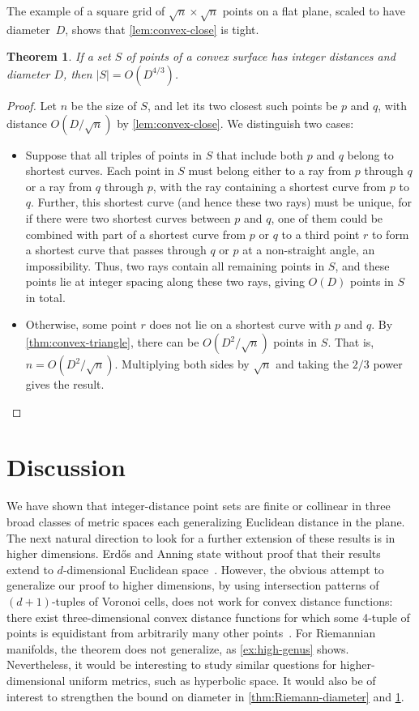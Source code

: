 \documentclass[11pt]{article}
\newtheorem{theorem}{Theorem}
\theoremstyle{definition}
\begin{document}
The example of a square grid of $\sqrt{n}\times\sqrt{n}$ points on a flat plane, scaled to have diameter~$D$, shows that \cref{lem:convex-close} is tight.

\begin{theorem}
\label{thm:convex-diameter}
If a set $S$ of points of a convex surface has integer distances and diameter $D$, then $|S|=O(D^{4/3})$.
\end{theorem}

\begin{proof}
Let $n$ be the size of $S$, and let its two closest such points be $p$ and $q$, with distance $O(D/\sqrt{n})$ by \cref{lem:convex-close}.  We distinguish two cases:
\begin{itemize}
\item Suppose that all triples of points in $S$ that include both $p$ and $q$ belong to shortest curves. Each point in $S$ must belong either to a ray from $p$ through $q$ or a ray from $q$ through $p$, with the ray containing a shortest curve from $p$ to $q$.
Further, this shortest curve (and hence these two rays) must be unique, for if there were two shortest curves between $p$ and $q$, one of them could be combined with part of a shortest curve from $p$ or $q$ to a third point $r$ to form a shortest curve that passes through $q$ or $p$ at a non-straight angle, an impossibility. Thus, two rays contain all remaining points in $S$, and these points lie at integer spacing along these two rays, giving $O(D)$ points in $S$ in total.
\item Otherwise, some point $r$ does not lie on a shortest curve with $p$ and $q$. By \cref{thm:convex-triangle}, there can be $O(D^2/\sqrt{n})$ points in $S$. That is, $n=O(D^2/\sqrt{n})$. Multiplying both sides by $\sqrt{n}$ and taking the $2/3$ power gives the result.\qedhere
\end{itemize}
\end{proof}

\section{Discussion}

We have shown that integer-distance point sets are finite or collinear in three broad classes of metric spaces each generalizing Euclidean distance in the plane. The next natural direction to look for a further extension of these results is in higher dimensions. Erd\H{o}s and Anning state without proof that their results extend to $d$-dimensional Euclidean space~\cite{AnnErd-BAMS-45}. However, the obvious attempt to generalize our proof to higher dimensions, by using intersection patterns of $(d+1)$-tuples of Voronoi cells, does not work for convex distance functions: there exist three-dimensional convex distance functions for which some 4-tuple of points is equidistant from arbitrarily many other points~\cite{IckKleLe-FI-95}. For Riemannian manifolds, the theorem does not generalize, as \cref{ex:high-genus} shows. Nevertheless, it would be interesting to study similar questions for higher-dimensional uniform metrics, such as hyperbolic space. It would also be of interest to strengthen the bound on diameter in \cref{thm:Riemann-diameter} and \cref{thm:convex-diameter}.



\end{document}
